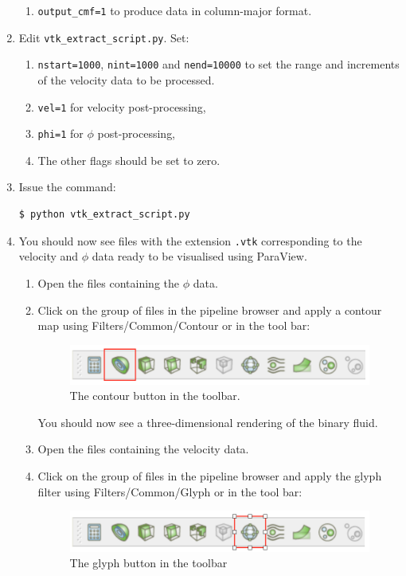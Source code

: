 \documentclass[11pt,twoside,a4paper]{article}
\begin{document}
\begin{enumerate}
\begin{enumerate}
\item \texttt{output\_cmf=1} to produce data in column-major format.
\end{enumerate}
\item Edit \texttt{vtk\_extract\_script.py}. Set:
\begin{enumerate}
\item \texttt{nstart=1000}, \texttt{nint=1000} and \texttt{nend=10000} to set the range and 
increments of the velocity data
to be processed.
\item \texttt{vel=1} for velocity post-processing, 
\item \texttt{phi=1} for $\phi$ post-processing,
\item The other flags should be set to zero. 
\end{enumerate}
\item Issue the command:
\begin{lstlisting}
$ python vtk_extract_script.py
\end{lstlisting}
\item You should now see files with the extension \texttt{.vtk} corresponding to the velocity 
and $\phi$ data ready to be visualised using ParaView.
\begin{enumerate}
\item Open the files containing the $\phi$ data.
\item Click on the group of files in the pipeline browser and apply a contour map using 
Filters/Common/Contour or in the tool bar: 

\begin{figure}[H]
\begin{center}
\includegraphics[width=0.8\linewidth]{contour.png}
  \caption{The contour button in the toolbar.}
  \label{fig:contour}
  \end{center}
\end{figure}

You should now see a three-dimensional rendering of the binary fluid.
\item Open the files containing the velocity data.
\item Click on the group of files in the pipeline browser and apply the glyph filter using 
Filters/Common/Glyph or in the tool bar: 

\begin{figure}[H]
\begin{center}
\includegraphics[width=0.8\linewidth]{glyph.png}
  \caption{The glyph button in the toolbar}
  \label{fig:glyph}
  \end{center}
\end{figure}


\end{enumerate}
\end{enumerate}
\end{document}
